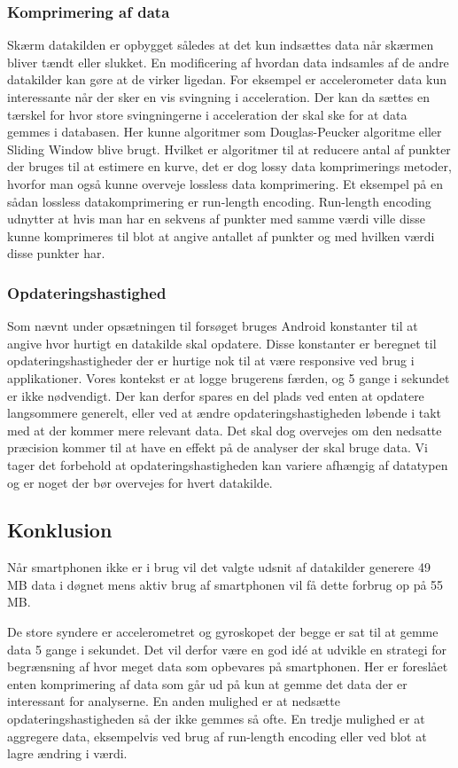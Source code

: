 \subsubsection{Komprimering af data}\label{sec:opryd}
Skærm datakilden er opbygget således at det kun indsættes data når skærmen bliver tændt eller slukket.
En modificering af hvordan data indsamles af de andre datakilder kan gøre at de virker ligedan. 
For eksempel er accelerometer data kun interessante når der sker en vis svingning i acceleration.
Der kan da sættes en tærskel for hvor store svingningerne i acceleration der skal ske for at data gemmes i databasen.
Her kunne algoritmer som Douglas-Peucker algoritme eller Sliding Window blive brugt.
Hvilket er algoritmer til at reducere antal af punkter der bruges til at estimere en kurve, det er dog lossy data komprimerings metoder, hvorfor man også kunne overveje lossless data komprimering.
Et eksempel på en sådan lossless datakomprimering er run-length encoding.
Run-length encoding udnytter at hvis man har en sekvens af punkter med samme værdi ville disse kunne komprimeres til blot at angive antallet af punkter og med hvilken værdi disse punkter har.

\subsubsection{Opdateringshastighed}
Som nævnt under opsætningen til forsøget bruges Android konstanter til at angive hvor hurtigt en datakilde skal opdatere.
Disse konstanter er beregnet til opdateringshastigheder der er hurtige nok til at være responsive ved brug i applikationer.
Vores kontekst er at logge brugerens færden, og 5 gange i sekundet er ikke nødvendigt.
Der kan derfor spares en del plads ved enten at opdatere langsommere generelt, eller ved at ændre opdateringshastigheden løbende i takt med at der kommer mere relevant data.
Det skal dog overvejes om den nedsatte præcision kommer til at have en effekt på de analyser der skal bruge data.
Vi tager det forbehold at opdateringshastigheden kan variere afhængig af datatypen og er noget der bør overvejes for hvert datakilde.

\subsection{Konklusion}
Når smartphonen ikke er i brug vil det valgte udsnit af datakilder generere 49 MB data i døgnet mens aktiv brug af smartphonen vil få dette forbrug op på 55 MB.

De store syndere er accelerometret og gyroskopet der begge er sat til at gemme data 5 gange i sekundet.
Det vil derfor være en god idé at udvikle en strategi for begrænsning af hvor meget data som opbevares på smartphonen.
Her er foreslået enten komprimering af data som går ud på kun at gemme det data der er interessant for analyserne.
En anden mulighed er at nedsætte opdateringshastigheden så der ikke gemmes så ofte.
En tredje mulighed er at aggregere data, eksempelvis ved brug af run-length encoding eller ved blot at lagre ændring i værdi.

